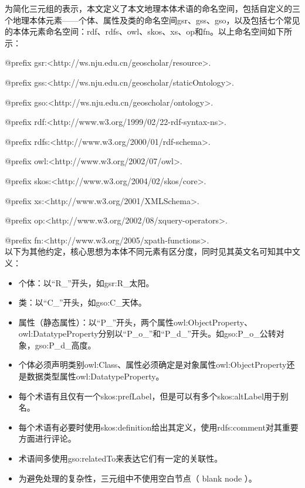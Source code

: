 为简化三元组的表示，本文定义了本文地理本体术语的命名空间，包括自定义的三个地理本体元素——个体、属性及类的命名空间gsr、gss、gso，以及包括七个常见的本体元素命名空间：rdf、rdfs、owl、skos、xs、op和fn。以上命名空间如下所示：


@prefix gsr:\hphantom{sss}<http://ws.nju.edu.cn/geoscholar/resource>.

@prefix gss:\hphantom{sss}<http://ws.nju.edu.cn/geoscholar/staticOntology>.

@prefix gso:\hphantom{ssl}<http://ws.nju.edu.cn/geoscholar/ontology>.

@prefix rdf:\hphantom{sss}<http://www.w3.org/1999/02/22-rdf-syntax-ns>.

@prefix rdfs:\hphantom{ss}<http://www.w3.org/2000/01/rdf-schema>.

@prefix owl:\hphantom{ss}<http://www.w3.org/2002/07/owl>.

@prefix skos:\hphantom{ll}<http://www.w3.org/2004/02/skos/core>.

@prefix xs:\hphantom{sssl}<http://www.w3.org/2001/XMLSchema>.

@prefix op:\hphantom{ssll}<http://www.w3.org/2002/08/xquery-operators>.

@prefix fn:\hphantom{sssl}<http://www.w3.org/2005/xpath-functions>.\linebreak[3]
\\
以下为其他约定，核心思想为本体不同元素有区分度，同时见其英文名可知其中文义：
\begin{itemize}
	\item {个体：以“R\_”开头，如gsr:R\_太阳。
	}
	\item {类：以“C\_”开头，如gso:C\_天体。
	}
	\item{属性（静态属性）：以“P\_”开头，两个属性owl:ObjectProperty、owl:DatatypeProperty分别以“P\_o\_”和“P\_d\_”开头。如gso:P\_o\_公转对象，gso:P\_d\_高度。
	}
	\item{个体必须声明类别owl:Class、属性必须确定是对象属性owl:ObjectProperty还是数据类型属性owl:DatatypeProperty。
	}
	\item{每个术语有且仅有一个skos:prefLabel，但是可以有多个skos:altLabel用于别名。
	}
	\item {每个术语有必要时使用skos:definition给出其定义，使用rdfs:comment对其重要方面进行评论。
	}
	\item {术语间多使用gso:relatedTo来表达它们有一定的关联性。
	}
	\item {为避免处理的复杂性，三元组中不使用空白节点（ blank node ）。
	}
\end{itemize}

